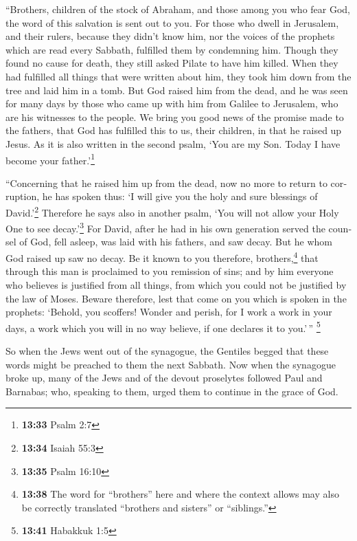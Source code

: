 \begin{paracol}{2}
\begin{otherlanguage}{english}
 ``Brothers, children of the stock of Abraham, and those
among you who fear God, the word of this salvation is sent out to you.
 For those who dwell in Jerusalem, and their rulers,
because they didn't know him, nor the voices of the prophets which are
read every Sabbath, fulfilled them by condemning him. 
Though they found no cause for death, they still asked Pilate to have
him killed.  When they had fulfilled all things that were
written about him, they took him down from the tree and laid him in a
tomb.  But God raised him from the dead, 
and he was seen for many days by those who came up with him from Galilee
to Jerusalem, who are his witnesses to the people.  We
bring you good news of the promise made to the fathers, 
that God has fulfilled this to us, their children, in that he raised up
Jesus. As it is also written in the second psalm, `You are my Son. Today
I have become your father.'\footnote{\textbf{13:33} Psalm 2:7}

 ``Concerning that he raised him up from the dead, now no
more to return to corruption, he has spoken thus: `I will give you the
holy and sure blessings of David.'\footnote{\textbf{13:34} Isaiah 55:3}
 Therefore he says also in another psalm, `You will not
allow your Holy One to see decay.'\footnote{\textbf{13:35} Psalm 16:10}
 For David, after he had in his own generation served the
counsel of God, fell asleep, was laid with his fathers, and saw decay.
 But he whom God raised up saw no decay. 
Be it known to you therefore, brothers,\footnote{\textbf{13:38} The word
  for ``brothers'' here and where the context allows may also be
  correctly translated ``brothers and sisters'' or ``siblings.''} that
through this man is proclaimed to you remission of sins; 
and by him everyone who believes is justified from all things, from
which you could not be justified by the law of Moses. 
Beware therefore, lest that come on you which is spoken in the prophets:
 `Behold, you scoffers! Wonder and perish, for I work a
work in your days, a work which you will in no way believe, if one
declares it to you.'\,'' \footnote{\textbf{13:41} Habakkuk 1:5}

 So when the Jews went out of the synagogue, the Gentiles
begged that these words might be preached to them the next Sabbath.
 Now when the synagogue broke up, many of the Jews and of
the devout proselytes followed Paul and Barnabas; who, speaking to them,
urged them to continue in the grace of God.


\end{otherlanguage}
\end{paracol}
